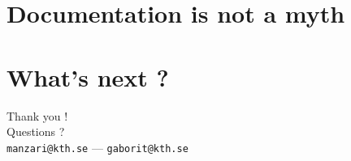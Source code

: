 \documentclass[10pt]{beamer}
\begin{document}

\section{Documentation is not a myth} %

\section{What's next ?} %


\begin{frame}[standout] %
	Thank you !\\
	\vspace{0.05\textwidth}
	Questions ?\\
	\vspace{0.25\textwidth}
	\scriptsize{\texttt{manzari@kth.se}} --- \scriptsize{\texttt{gaborit@kth.se}}\\
\end{frame}

\end{document}
